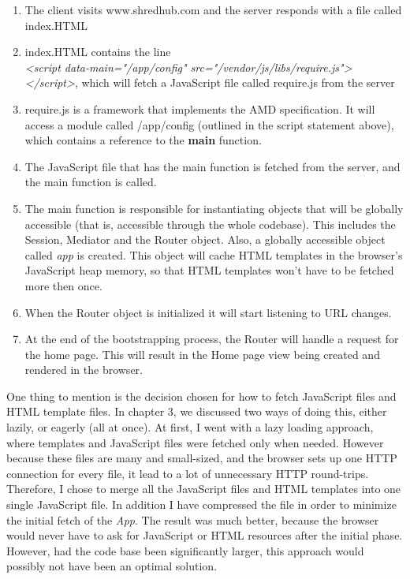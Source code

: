 \begin{enumerate}
\item{} The client visits www.shredhub.com and the server responds with a file called index.HTML
\item{} index.HTML contains the line \\ \textit{<script data-main="/app/config" src="/vendor/js/libs/require.js"></script>}, which will fetch a JavaScript file called require.js from the server
\item{} require.js is a framework that implements the AMD specification. It will access a module called /app/config (outlined in the script statement above), which contains a reference to the \textbf{main} function.
\item{} The JavaScript file that has the main function is fetched from the server, and the main function is called.
\item{} The main function is responsible for instantiating objects that will be globally accessible (that is, accessible through the whole codebase). This includes the Session, Mediator and the Router object. Also, a globally accessible object called \textit{app} is created. This object will cache HTML templates in the browser's JavaScript heap memory, so that HTML templates won't have to be fetched more then once. 
\item{} When the Router object is initialized it will start listening to URL changes. 
\item{} At the end of the bootstrapping process, the Router will handle a request for the home page. This will result in the Home page view being created and rendered in the browser.
\end{enumerate}

One thing to mention is the decision chosen for how to fetch JavaScript files and HTML template files. In chapter 3, we discussed two ways of doing this, either lazily, or eagerly (all at once). At first, I went with a lazy loading approach, where templates and JavaScript files were fetched only when needed. However because these files are many and small-sized, and the browser sets up one HTTP connection for every file, it lead to a lot of unnecessary HTTP round-trips. Therefore, I chose to merge all the JavaScript files and HTML templates into one single JavaScript file. In addition I have compressed the file in order to minimize the initial fetch of the \textit{App}. The result was much better, because the browser would never have to ask for JavaScript or HTML resources after the initial phase. However, had the code base been significantly larger, this approach would possibly not have been an optimal solution. 

